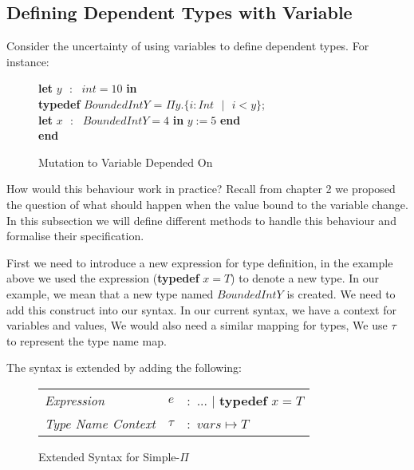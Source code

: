 \documentclass[a4paper,12pt]{report}
\newenvironment{tabs}[1]
 {\flushleft\TabPositions{#1}}
 {\endflushleft}
\begin{document}
\subsection{Defining Dependent Types with Variable}
Consider the uncertainty of using variables to define dependent types. For 
instance: 

\begin{figure} [H]
  \begin{tabs}{1cm,2cm}
    \textbf{let }$y\text{ }:\text{ } int = 10$ \textbf{ in } \\
    \tab\textbf{typedef }$BoundedIntY$ = $\Pi y. \{i : Int\text{ }|\text{ }i < y\}$; \\ 
    \tab\textbf{let }$x\text{ }:\text{ }BoundedIntY = 4$ \textbf{ in }$y := 5$\textbf { end} \\
    \textbf {end}
  \end{tabs}  
  \caption{Mutation to Variable Depended On}
\end{figure}

\par
How would this behaviour work in practice? Recall from chapter 2 we proposed the 
question of what should happen when the value bound to the variable change. In 
this subsection we will define different methods to handle this behaviour and 
formalise their specification.

\par
First we need to introduce a new expression for type definition, in the example 
above we used the expression (\textbf{typedef} $x = T$) to denote a new type. 
In our example, we mean 
that a new type named $BoundedIntY$ is created. We need to add this construct 
into our syntax. In our current syntax, we have a context for variables and 
values, We would also need a similar mapping for types, We use $\tau$ to 
represent the type name map. 

\par
The syntax is extended by adding the following: 
\begin{figure}[H]
  \begin{center}
    \begin{tabular} {l l l}
      \textit{Expression} & $e$ & $:$ ... $|$ \textbf{typedef }$x = T$ \\
      \textit{Type Name Context} & $\tau$& $:$ $vars \mapsto T$ \\
    \end{tabular}
  \end{center}
  \caption{Extended Syntax for Simple-$\Pi$}
\end{figure}
\end{document}
